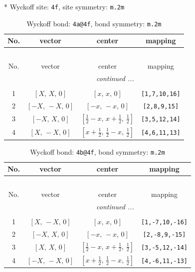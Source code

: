 \documentclass[fleqn,8pt]{jsarticle}
\begin{document}
* Wyckoff site: {\tt 4f}, site symmetry: {\tt m.2m}
\renewcommand{\arraystretch}{1.2}
\begin{longtable}{cccc}
\caption{Wyckoff bond: {\tt 4a@4f}, bond symmetry: {\tt m.2m}}
 \\
 \hline \hline
No. & vector & center & mapping \\ \hline \endfirsthead

\multicolumn{3}{l}{\tablename\ \thetable{}} \\
 \hline \hline
No. & vector & center & mapping \\ \hline \endhead

 \hline \hline
\multicolumn{3}{r}{\footnotesize\it continued ...} \\ \endfoot

 \hline \hline
\multicolumn{3}{r}{} \\ \endlastfoot

1 & $\left[ X,\, X,\, 0 \right]$ & $\left[ x,\, x,\, 0 \right]$ & {\tt [1,7,10,16]} \\ \hline
2 & $\left[ - X,\, - X,\, 0 \right]$ & $\left[ - x,\, - x,\, 0 \right]$ & {\tt [2,8,9,15]} \\ \hline
3 & $\left[ - X,\, X,\, 0 \right]$ & $\left[ \frac{1}{2} - x,\, x + \frac{1}{2},\, \frac{1}{2} \right]$ & {\tt [3,5,12,14]} \\ \hline
4 & $\left[ X,\, - X,\, 0 \right]$ & $\left[ x + \frac{1}{2},\, \frac{1}{2} - x,\, \frac{1}{2} \right]$ & {\tt [4,6,11,13]} \\
\end{longtable}
\renewcommand{\arraystretch}{1.2}
\begin{longtable}{cccc}
\caption{Wyckoff bond: {\tt 4b@4f}, bond symmetry: {\tt m.2m}}
 \\
 \hline \hline
No. & vector & center & mapping \\ \hline \endfirsthead

\multicolumn{3}{l}{\tablename\ \thetable{}} \\
 \hline \hline
No. & vector & center & mapping \\ \hline \endhead

 \hline \hline
\multicolumn{3}{r}{\footnotesize\it continued ...} \\ \endfoot

 \hline \hline
\multicolumn{3}{r}{} \\ \endlastfoot

1 & $\left[ X,\, - X,\, 0 \right]$ & $\left[ x,\, x,\, 0 \right]$ & {\tt [1,-7,10,-16]} \\ \hline
2 & $\left[ - X,\, X,\, 0 \right]$ & $\left[ - x,\, - x,\, 0 \right]$ & {\tt [2,-8,9,-15]} \\ \hline
3 & $\left[ X,\, X,\, 0 \right]$ & $\left[ \frac{1}{2} - x,\, x + \frac{1}{2},\, \frac{1}{2} \right]$ & {\tt [3,-5,12,-14]} \\ \hline
4 & $\left[ - X,\, - X,\, 0 \right]$ & $\left[ x + \frac{1}{2},\, \frac{1}{2} - x,\, \frac{1}{2} \right]$ & {\tt [4,-6,11,-13]} \\
\end{longtable}
\end{document}
